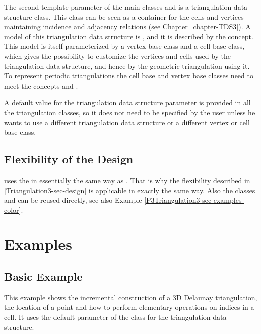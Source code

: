 The second template parameter of the main classes
 and
 is a
triangulation data structure class.  This class can be seen as a container for
the cells and vertices maintaining incidence and adjacency relations (see
Chapter~\ref{chapter-TDS3}).  A model of this triangulation data structure is
, and it is described by the
 concept.  This model is itself
parameterized by a vertex base class and a cell base class, which gives the
possibility to customize the vertices and cells used by the triangulation data
structure, and hence by the geometric triangulation using it.
To represent periodic triangulations the cell base and vertex base
classes need to meet the concepts
 and
.

A default value for the triangulation data structure parameter is provided in
all the triangulation classes, so it does not need to be specified by
the user unless he wants to use a different triangulation data
structure or a different vertex or cell base class.

\subsection{Flexibility of the Design}
 uses the
 in essentially the same way as
. That is why the flexibility described in
\ref{Triangulation3-sec-design} is applicable in exactly the same
way. Also the classes  and
 can be reused directly, see
also Example \ref{P3Triangulation3-sec-examples-color}.

\section{Examples\label{P3Triangulation3-sec-examples}}
\subsection{Basic Example}
This example shows the incremental construction of a 3D Delaunay
triangulation, the location of a point and how to perform elementary
operations on indices in a cell. It uses the default parameter of the
 class for the triangulation
data structure.


